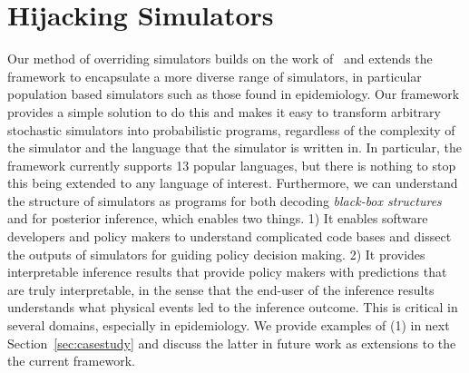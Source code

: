 \documentclass{article}
\begin{document}



\section{Hijacking Simulators}
\label{sec:hijackingsimulators}
 Our method of overriding simulators builds on the work of~\cite{baydin2018efficient} and extends the framework to encapsulate a more diverse range of simulators, in particular population based simulators such as those found in epidemiology.
Our framework provides a simple solution to do this and makes it easy to transform arbitrary stochastic simulators into probabilistic programs, regardless of the complexity of the simulator and the language that the simulator is written in. 
In particular, the framework currently supports 13 popular languages, but there is nothing to stop this being extended to any language of interest. 
Furthermore, we can understand the structure of simulators as programs for both decoding \emph{black-box structures} and for posterior inference, which enables two things. 
1) It enables software developers and policy makers to understand complicated code bases and dissect the outputs of simulators for guiding policy decision making.
 2) It provides interpretable inference results that provide policy makers with predictions that are truly interpretable, in the sense that the end-user of the inference results understands what physical events led to the inference outcome. 
 This is critical in several domains, especially in epidemiology. 
 We provide examples of (1) in next Section~\ref{sec:casestudy} and discuss the latter in future work as extensions to the the current framework.
\end{document}
